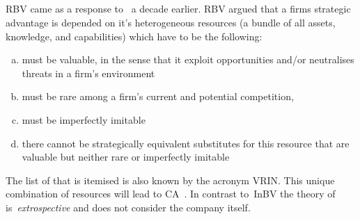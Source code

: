 \subsection{} %

\Gls{RBV} came as a response to~\cite{Porter:1980} a decade earlier.
\Gls{RBV} argued that a firms strategic advantage is depended on it's heterogeneous resources (a bundle of all assets, knowledge, and capabilities) which have to be the following:

\begin{enumerate}[(a)]
   \setlength{\itemsep}{1pt}
\item must be valuable, in the sense that it exploit opportunities and/or neutralises threats in a firm’s environment
\item must be rare among a firm’s current and potential competition, 
\item must be imperfectly imitable
\item  there cannot be strategically equivalent substitutes for this resource that are valuable but neither rare or imperfectly imitable 
\end{enumerate} 
The list of that is itemised is also known by the acronym VRIN\@.
This unique combination of resources will lead to \gls{CA}~\cite{Barney:1991}. 
In contrast to~\gls{InBV} the theory of~\cite{Barney:1991} is~\emph{extrospective} and does not consider the company itself.